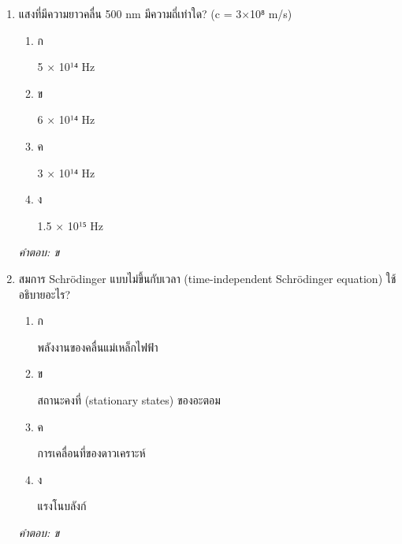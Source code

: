 \documentclass[12pt]{article}
\begin{document}
\begin{enumerate}[label=\arabic*., itemsep=0.5\baselineskip, topsep=0.5\baselineskip, leftmargin=*]
\item แสงที่มีความยาวคลื่น 500 nm มีความถี่เท่าใด? (c = 3×10⁸ m/s)
\begin{enumerate}[label=\alph*)., itemsep=0.3\baselineskip, topsep=0.3\baselineskip]
\item ก\ 
\begin{minipage}[t]{0.9\linewidth}
\raggedright 5 × 10¹⁴ Hz
\end{minipage}
\item ข\ 
\begin{minipage}[t]{0.9\linewidth}
\raggedright 6 × 10¹⁴ Hz
\end{minipage}
\item ค\ 
\begin{minipage}[t]{0.9\linewidth}
\raggedright 3 × 10¹⁴ Hz
\end{minipage}
\item ง\ 
\begin{minipage}[t]{0.9\linewidth}
\raggedright 1.5 × 10¹⁵ Hz
\end{minipage}
\end{enumerate}
\vspace{-0.3\baselineskip}
\begin{small}
\textit{คำตอบ: ข}
\end{small}

\item สมการ Schrödinger แบบไม่ขึ้นกับเวลา (time-independent Schrödinger equation) ใช้อธิบายอะไร?
\begin{enumerate}[label=\alph*)., itemsep=0.3\baselineskip, topsep=0.3\baselineskip]
\item ก\ 
\begin{minipage}[t]{0.9\linewidth}
\raggedright พลังงานของคลื่นแม่เหล็กไฟฟ้า
\end{minipage}
\item ข\ 
\begin{minipage}[t]{0.9\linewidth}
\raggedright สถานะคงที่ (stationary states) ของอะตอม
\end{minipage}
\item ค\ 
\begin{minipage}[t]{0.9\linewidth}
\raggedright การเคลื่อนที่ของดาวเคราะห์
\end{minipage}
\item ง\ 
\begin{minipage}[t]{0.9\linewidth}
\raggedright แรงโนบลังก์
\end{minipage}
\end{enumerate}
\vspace{-0.3\baselineskip}
\begin{small}
\textit{คำตอบ: ข}
\end{small}


\end{enumerate}
\end{document}
